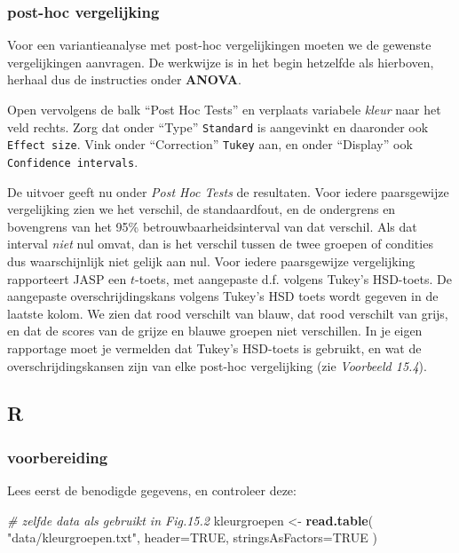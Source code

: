 \documentclass[
]{book}
\newenvironment{Shaded}{\begin{snugshade}}{\end{snugshade}}
\newcommand{\CommentTok}[1]{\textcolor[rgb]{0.56,0.35,0.01}{\textit{#1}}}
\newcommand{\DataTypeTok}[1]{\textcolor[rgb]{0.13,0.29,0.53}{#1}}
\newcommand{\KeywordTok}[1]{\textcolor[rgb]{0.13,0.29,0.53}{\textbf{#1}}}
\newcommand{\NormalTok}[1]{#1}
\newcommand{\OtherTok}[1]{\textcolor[rgb]{0.56,0.35,0.01}{#1}}
\newcommand{\StringTok}[1]{\textcolor[rgb]{0.31,0.60,0.02}{#1}}
\begin{document}
\hypertarget{post-hoc-vergelijking-1}{%
\subsubsection{post-hoc vergelijking}\label{post-hoc-vergelijking-1}}

Voor een variantieanalyse met post-hoc vergelijkingen moeten we de
gewenste vergelijkingen aanvragen. De werkwijze is in het begin
hetzelfde als hierboven, herhaal dus de instructies onder \textbf{ANOVA}.

Open vervolgens de balk ``Post Hoc Tests'' en verplaats variabele \emph{kleur} naar het veld rechts. Zorg dat onder ``Type'' \texttt{Standard} is aangevinkt en daaronder ook \texttt{Effect\ size}. Vink onder ``Correction'' \texttt{Tukey} aan, en onder ``Display'' ook \texttt{Confidence\ intervals}.

De uitvoer geeft nu onder \emph{Post Hoc Tests} de resultaten.
Voor iedere paarsgewijze vergelijking zien we het verschil, de
standaardfout, en de ondergrens en bovengrens van het 95\% betrouwbaarheidsinterval van dat verschil.
Als dat interval \emph{niet} nul omvat, dan is het verschil tussen de twee
groepen of condities dus waarschijnlijk niet gelijk aan nul.
Voor iedere paarsgewijze vergelijking rapporteert JASP een \(t\)-toets, met aangepaste d.f. volgens Tukey's HSD-toets. De
aangepaste overschrijdingskans volgens Tukey's HSD toets wordt gegeven in de laatste kolom. We zien dat rood verschilt van blauw, dat
rood verschilt van grijs, en dat de scores van de grijze en blauwe
groepen niet verschillen. In je eigen rapportage moet je vermelden dat Tukey's HSD-toets is gebruikt, en wat de overschrijdingskansen zijn van elke post-hoc vergelijking (zie \emph{Voorbeeld 15.4}).

\hypertarget{r-15}{%
\subsection{R}\label{r-15}}

\hypertarget{voorbereiding-3}{%
\subsubsection{voorbereiding}\label{voorbereiding-3}}

Lees eerst de benodigde gegevens, en controleer deze:

\begin{Shaded}
\begin{Highlighting}[]
\CommentTok{\# zelfde data als gebruikt in Fig.15.2}
\NormalTok{kleurgroepen \textless{}{-}}\StringTok{ }\KeywordTok{read.table}\NormalTok{( }\StringTok{"data/kleurgroepen.txt"}\NormalTok{, }
                            \DataTypeTok{header=}\OtherTok{TRUE}\NormalTok{, }\DataTypeTok{stringsAsFactors=}\OtherTok{TRUE}\NormalTok{ )}
\end{Highlighting}
\end{Shaded}
\end{document}
